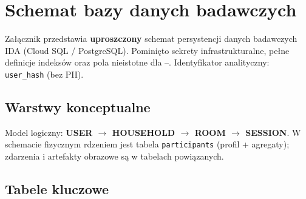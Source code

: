 \chapter{Schemat bazy danych badawczych}
\label{app:a:top}

Załącznik przedstawia \textbf{uproszczony} schemat persystencji danych badawczych IDA (Cloud SQL / PostgreSQL). Pominięto sekrety infrastrukturalne, pełne definicje indeksów oraz pola nieistotne dla --. Identyfikator analityczny: \texttt{user\_hash} (bez PII).

\section{Warstwy konceptualne}
\label{app:a:sec:warstwy}

Model logiczny: \textbf{USER $\rightarrow$ HOUSEHOLD $\rightarrow$ ROOM $\rightarrow$ SESSION}. W schemacie fizycznym rdzeniem jest tabela \texttt{participants} (profil + agregaty); zdarzenia i artefakty obrazowe są w tabelach powiązanych.

\section{Tabele kluczowe}
\label{app:a:sec:tabele}

